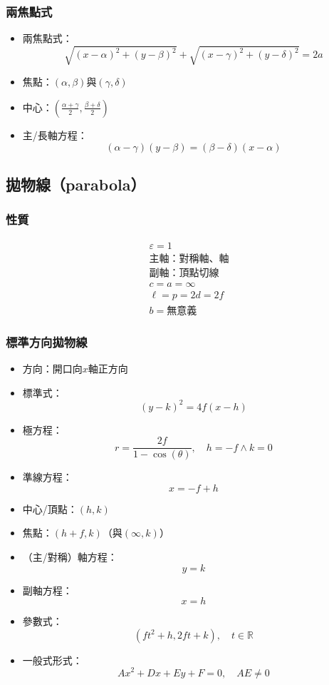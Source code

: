 \documentclass[a4paper,12pt]{article}
\begin{document}
\subsubsection{兩焦點式}
\begin{itemize}
\item 兩焦點式：
\[\sqrt{(x-\alpha)^2+(y-\beta)^2}+\sqrt{(x-\gamma)^2+(y-\delta)^2}=2a\]
\item 焦點：$(\alpha,\beta)$與$(\gamma,\delta)$
\item 中心：$\left(\frac{\alpha+\gamma}{2},\frac{\beta+\delta}{2}\right)$
\item 主/長軸方程：
\[(\alpha-\gamma)(y-\beta)=(\beta-\delta)(x-\alpha)\]
\end{itemize}
\subsection{拋物線（parabola）}
\subsubsection{性質}
\[\begin{aligned}
&\varepsilon=1\\
&\text{主軸：對稱軸、軸}\\
&\text{副軸：頂點切線}\\
&c=a=\infty\\
&\ell=p=2d=2f\\
&b=\text{無意義}
\end{aligned}\]
\subsubsection{標準方向拋物線}
\begin{itemize}
\item 方向：開口向$x$軸正方向
\item 標準式：
\[(y-k)^2=4f(x-h)\]
\item 極方程：
\[r=\frac{2f}{1-\cos(\theta)},\quad h=-f\land k=0\]
\item 準線方程：
\[x=-f+h\]
\item 中心/頂點：$(h,k)$
\item 焦點：$(h+f,k)$（與$(\infty,k)$）
\item （主/對稱）軸方程：
\[y=k\]
\item 副軸方程：
\[x=h\]
\item 參數式：
\[(ft^2+h,2ft+k),\quad t\in\mathbb{R}\]
\item 一般式形式：
\[Ax^2+Dx+Ey+F=0,\quad AE\neq 0\]
\end{itemize}
\end{document}

